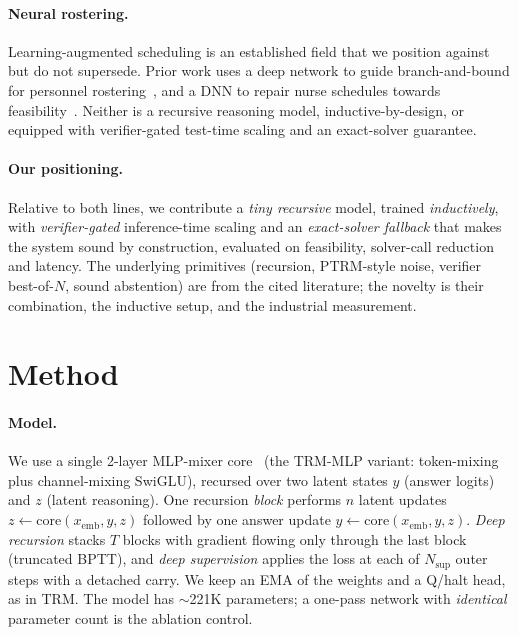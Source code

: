 \documentclass{article}
\begin{document}
\paragraph{Neural rostering.} Learning-augmented scheduling is an established
field that we position against but do not supersede. Prior work uses a deep
network to guide branch-and-bound for personnel rostering~\cite{dnntree}, and a
DNN to repair nurse schedules towards feasibility~\cite{nurserepair}. Neither is a
recursive
reasoning model, inductive-by-design, or equipped with verifier-gated test-time
scaling and an exact-solver guarantee.

\paragraph{Our positioning.} Relative to both lines, we contribute a \emph{tiny
recursive} model, trained \emph{inductively}, with \emph{verifier-gated}
inference-time scaling and an \emph{exact-solver fallback} that makes the system
sound by construction, evaluated on feasibility, solver-call reduction and
latency. The underlying primitives (recursion, PTRM-style noise, verifier
best-of-$N$, sound abstention) are from the cited literature; the novelty is their
combination, the inductive setup, and the industrial measurement.

\section{Method}
\label{sec:method}

\paragraph{Model.} We use a single 2-layer MLP-mixer core~\cite{mlpmixer} (the
TRM-MLP variant: token-mixing plus channel-mixing SwiGLU), recursed over two
latent states $y$ (answer logits) and $z$ (latent reasoning). One recursion
\emph{block} performs $n$ latent updates
$z \leftarrow \mathrm{core}(x_\mathrm{emb}, y, z)$ followed by one answer update
$y \leftarrow \mathrm{core}(x_\mathrm{emb}, y, z)$. \emph{Deep recursion} stacks
$T$ blocks with gradient flowing only through the last block (truncated BPTT), and
\emph{deep supervision} applies the loss at each of $N_\mathrm{sup}$ outer steps
with a detached carry. We keep an EMA of the weights and a Q/halt head, as in TRM.
The model has $\sim$221K parameters; a one-pass network with \emph{identical}
parameter count is the ablation control.
\end{document}
